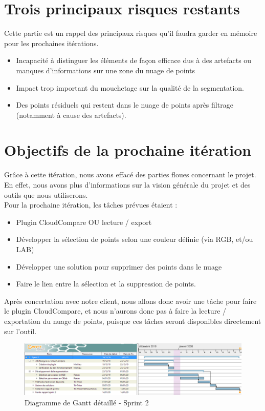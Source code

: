 \documentclass[12pt,titlepage,french]{article}
\begin{document}
\section{Trois principaux risques restants}
Cette partie est un rappel des principaux risques qu'il faudra garder en mémoire pour les prochaines itérations.

\begin{itemize}
  \item Incapacité à distinguer les éléments de façon efficace dus à des artefacts ou manques d'informations sur une zone du nuage de points
  \item Impact trop important du mouchetage sur la qualité de la segmentation.
  \item Des points résiduels qui restent dans le nuage de points après filtrage (notamment à cause des artefacts).
\end{itemize}

\section{Objectifs de la prochaine itération}
Grâce à cette itération, nous avons effacé des parties floues concernant le projet. En effet, nous avons plus d'informations sur la vision générale du projet et des outils que nous utiliserons. \\
Pour la prochaine itération, les tâches prévues étaient :
\begin{itemize}
  \item Plugin CloudCompare OU lecture / export
  \item Développer la sélection de points selon une couleur définie (via RGB, et/ou LAB)
  \item Développer une solution pour supprimer des points dans le nuage
  \item Faire le lien entre la sélection et la suppression de points.
\end{itemize}

Après concertation avec notre client, nous allons donc avoir une tâche pour faire le plugin CloudCompare, et nous n'aurons donc pas à faire la lecture / exportation du nuage de points, puisque ces tâches seront disponibles directement sur l'outil.

\begin{figure}[!hbtp]
  \caption{\label{} Diagramme de Gantt détaillé - Sprint 2}
  \includegraphics[width=1.1\textwidth]{./img/sprint_iteration_2.PNG}
\end{figure}
\end{document}
